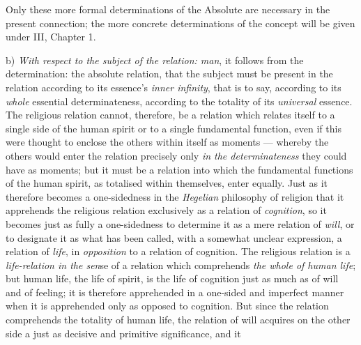 \documentclass[12pt,a4paper]{book}
\begin{document}
Only these more formal determinations of the Absolute are necessary in the
present connection; the more concrete determinations of the concept will be
given under III, Chapter 1.

b) \emph{With respect to the subject of the relation: man}, it follows from
the determination: the absolute relation, that the subject must be present
in the relation according to its essence's \emph{inner infinity}, that is to
say, according to its \emph{whole} essential determinateness, according to the
totality of its \emph{universal} essence. The religious relation cannot,
therefore, be a relation which relates itself to a single side of the human
spirit or to a single fundamental function, even if this were thought to
enclose the others within itself as moments --- whereby the others would enter
the relation precisely only \emph{in the determinateness} they could have as
moments; but it must be a relation into which the fundamental functions of the
human spirit, as totalised within themselves, enter equally. Just as it
therefore becomes a one-sidedness in the \emph{Hegelian} philosophy of
religion that it apprehends the religious relation exclusively as a relation
of \emph{cognition}, so it becomes just as fully a one-sidedness to determine
it as a mere relation of \emph{will}, or to designate it as what has been
called, with a somewhat unclear expression, a relation of \emph{life}, in
\emph{opposition} to a relation of cognition. The religious relation is a
\emph{life-relation in the sen}se of a relation which comprehends \emph{the
whole of human life}; but human life, the life of spirit, is the life of
cognition just as much as of will and of feeling; it is therefore apprehended
in a one-sided and imperfect manner when it is apprehended only as opposed to
cognition. But since the relation comprehends the totality of human life, the
relation of will acquires on the other side a just as decisive and primitive
significance, and it
\end{document}

